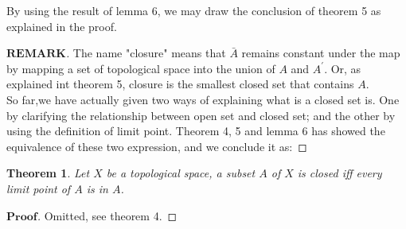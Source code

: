 \documentclass[a4paper, 11pt]{article}
\newtheorem{theorem}{Theorem}
\theoremstyle{remark}
\newenvironment{myremark}
{\renewcommand\qedsymbol{$ $}\begin{proof}[$\mathbf{REMARK}$]}
  {\end{proof}}
\newenvironment{myprf}
{\renewcommand\qedsymbol{$ $}\begin{proof}[$\mathbf{Proof}$]}
  {\end{proof}}
\theoremstyle{definition}
\begin{document}
\noindent
By using the result of lemma 6, we may draw the conclusion of theorem 5 as 
explained in the proof.
\begin{myremark}
     The name "closure" means that $\bar{A}$ remains constant under the map 
     by mapping a set of topological space into the union of $A$ and 
     $A^{'}$. Or, as explained 
     int theorem 5, closure is the smallest closed set that contains $A$.\\
     So far,we have actually given two ways of explaining what is a closed set
     is. One by clarifying the relationship between open set and closed set; and
     the other by using the definition of limit point. Theorem 4, 5 and lemma 6
     has showed the equivalence of these two expression, and we conclude it as:
\end{myremark}
\begin{theorem}
     Let $X$ be a topological space, a subset $A$ of $X$ is closed iff every limit
     point of $A$ is in $A$.
\end{theorem}
\begin{myprf}
       Omitted, see theorem 4.
\end{myprf}
\end{document}
